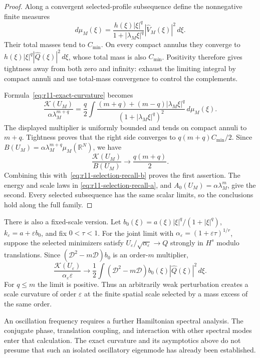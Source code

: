 \begin{proof}
Along a convergent selected-profile subsequence define the nonnegative
finite measures
\[
 d\mu_M(\xi)=
 \frac{h(\xi)|\xi|^q}{1+|\lambda_M\xi|^q}
                       |\widehat V_M(\xi)|^2\,d\xi.
\]
Their total masses tend to $C_{\min}$.  On every compact annulus they
converge to
$h(\xi)|\xi|^q|\widehat Q(\xi)|^2\,d\xi$, whose total mass is also
$C_{\min}$.  Positivity therefore gives tightness away from both zero
and infinity: exhaust the limiting integral by compact annuli and use
total-mass convergence to control the complements.

Formula~\eqref{eq:r11-exact-curvature} becomes
\[
 \frac{\mathcal K(U_M)}{\alpha\lambda_M^{m+q}}
 =\frac q2\int
 \frac{(m+q)+(m-q)|\lambda_M\xi|^q}
      {(1+|\lambda_M\xi|^q)^2}\,d\mu_M(\xi).
\]
The displayed multiplier is uniformly bounded and tends on compact
annuli to $m+q$.  Tightness proves that the right side converges to
$q(m+q)C_{\min}/2$.  Since
$B(U_M)=\alpha\lambda_M^{m+q}\mu_M(\mathbb R^N)$, we have
\[
 \frac{\mathcal K(U_M)}{B(U_M)}\longrightarrow\frac{q(m+q)}2.
\]
Combining this with~\eqref{eq:r11-selection-recall-b} proves the first
assertion.  The energy and scale laws in
\eqref{eq:r11-selection-recall-a}, and
$A_0(U_M)=\alpha\lambda_M^m$, give the second.  Every selected
subsequence has the same scalar limits, so the conclusions hold along
the full family.
\end{proof}

There is also a fixed-scale version.  Let
$b_0(\xi)=a(\xi)|\xi|^q/(1+|\xi|^q)$,
$k_\varepsilon=a+\varepsilon b_0$, and fix $0<\tau<1$.
For the joint limit with
$\alpha_\varepsilon=(1+\varepsilon\tau)^{1/r}$, suppose the
selected minimizers satisfy
$U_\varepsilon/\sqrt{\alpha_\varepsilon}\to Q$ strongly in $H^s$
modulo translations.  Since
$(\mathcal D^2-m\mathcal D)b_0$ is an order-$m$ multiplier,
\begin{equation}\label{eq:r11-joint-curvature}
 \frac{\mathcal K(U_\varepsilon)}
      {\alpha_\varepsilon\varepsilon}
 \longrightarrow\frac12\int
       (\mathcal D^2-m\mathcal D)b_0(\xi)|\widehat Q(\xi)|^2\,d\xi.
\end{equation}
For $q\le m$ the limit is positive.  Thus an arbitrarily weak
perturbation creates a scale curvature of order $\varepsilon$ at the
finite spatial scale selected by a mass excess of the same order.

An oscillation frequency requires a further Hamiltonian spectral
analysis.  The conjugate phase, translation coupling, and interaction
with other spectral modes enter that calculation.  The exact curvature
and its asymptotics above do not presume that such an isolated
oscillatory eigenmode has already been established.


